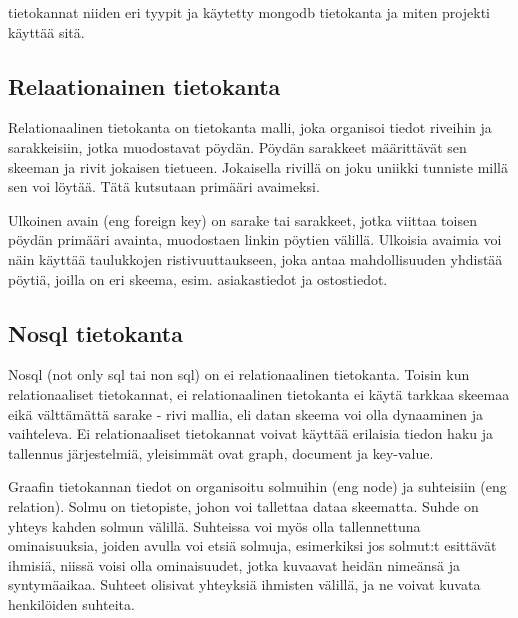 

tietokannat niiden eri tyypit ja käytetty mongodb tietokanta ja miten projekti käyttää sitä.




\subsection*{Relaationainen tietokanta}


Relationaalinen tietokanta on tietokanta malli, joka organisoi tiedot riveihin ja sarakkeisiin, jotka muodostavat pöydän. 
Pöydän sarakkeet määrittävät sen skeeman ja rivit jokaisen tietueen.
Jokaisella rivillä on joku uniikki tunniste millä sen voi löytää. Tätä kutsutaan primääri avaimeksi.
\medskip

Ulkoinen avain (eng foreign key) on sarake tai sarakkeet, jotka viittaa toisen pöydän primääri avainta, muodostaen linkin pöytien välillä.
Ulkoisia avaimia voi näin käyttää taulukkojen ristivuuttaukseen, joka antaa mahdollisuuden yhdistää pöytiä, joilla on eri skeema, esim. asiakastiedot ja ostostiedot. 
\medskip


\medskip

\subsection*{Nosql tietokanta}


Nosql (not only sql tai non sql) on ei relationaalinen tietokanta.
Toisin kun relationaaliset tietokannat, ei relationaalinen tietokanta ei käytä tarkkaa skeemaa eikä välttämättä sarake - rivi mallia, eli datan skeema voi olla dynaaminen ja vaihteleva.
Ei relationaaliset tietokannat voivat käyttää erilaisia tiedon haku ja tallennus järjestelmiä, yleisimmät ovat graph, document ja key-value.
\medskip



Graafin tietokannan tiedot on organisoitu solmuihin (eng node) ja suhteisiin (eng relation).
Solmu on tietopiste, johon voi tallettaa dataa skeematta. 
Suhde on yhteys kahden solmun välillä. Suhteissa voi myös olla tallennettuna ominaisuuksia, joiden avulla voi etsiä solmuja,
esimerkiksi jos solmut:t esittävät ihmisiä, niissä voisi olla ominaisuudet, jotka kuvaavat heidän nimeänsä ja syntymäaikaa.
Suhteet olisivat yhteyksiä ihmisten välillä, ja ne voivat kuvata henkilöiden suhteita.
\medskip

